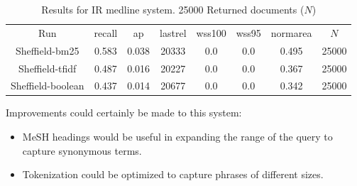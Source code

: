 \begin{table}[H]
\centering
\begin{tabular}{|c|c|c|c|c|c|c|c|} 
 \hline
 Run & recall &  ap & lastrel & wss100 & wss95 & normarea & $N$ \\ 
  Sheffield-bm25 & 0.583 &0.038 & 20333 &0.0 &0.0 & 0.495 & 25000 \\
  Sheffield-tfidf & 0.487 &0.016 & 20227 &0.0 &0.0 & 0.367 & 25000 \\
  Sheffield-boolean & 0.437 &0.014 & 20677 &0.0 &0.0 & 0.342 & 25000 \\
 \hline
\end{tabular}
\caption{Results for IR medline system. 25000 Returned documents ($N$) }
\end{table}

Improvements could certainly be made to this system:

\begin{itemize}
  \item MeSH headings would be useful in expanding the range of the query to capture synonymous terms. 
  \item Tokenization could be optimized to capture phrases of different sizes.
\end{itemize}





